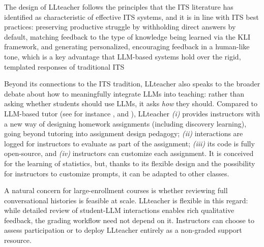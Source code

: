 \documentclass[
  12pt]{article}
\begin{document}
The design of LLteacher follows the principles that the ITS literature has identified as characteristic of effective ITS systems, and it is in line with ITS best practices: preserving productive struggle by withholding direct answers by default, matching feedback to the type of knowledge being learned via the KLI framework, and generating personalized, encouraging feedback in a human-like tone, which is a key advantage that LLM-based systems hold over the rigid, templated responses of traditional ITS \citep{stamper2024enhancing}

Beyond its connections to the ITS tradition, LLteacher also speaks to the broader debate about how to meaningfully integrate LLMs into teaching: rather than asking whether students should use LLMs, it asks \textit{how} they should.
Compared to LLM-based tutor (see for instance \citet{kazemitabaar2024codeaid}, \citet{hobert-berens-2024} and \citet{liu2025lpitutor}), LLteacher \textit{(i)} provides instructors with a new way of designing homework assignments (including discovery learning), going beyond tutoring into assignment design pedagogy; \textit{(ii)} interactions are logged for instructors to evaluate as part of the assignment; \textit{(iii)} its code is fully open-source, and \textit{(iv)} instructors can customize each assignment. It is conceived for the learning of statistics, but, thanks to its flexible design and the possibility for instructors to customize prompts, it can be adapted to other classes.


A natural concern for large-enrollment courses is whether reviewing full conversational histories is feasible at scale. LLteacher is flexible in this regard: while detailed review of student-LLM interactions enables rich qualitative feedback, the grading workflow need not depend on it. Instructors can choose to assess participation or to deploy LLteacher entirely as a non-graded support resource.
\end{document}
